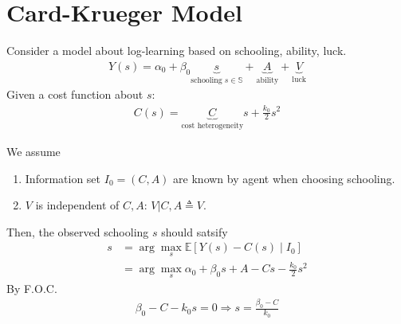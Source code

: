 \documentclass[11pt]{elegantbook}
\begin{document}
\section{Card-Krueger Model}
Consider a model about log-learning based on schooling, ability, luck.
\begin{equation}
    \begin{aligned}
        Y(s)=\alpha_0+\beta_0 \underbrace{s}_{\text{schooling }s\in \mathbb{S}} +\underbrace{A}_\text{ability} + \underbrace{V}_\text{luck}
    \end{aligned}
    \nonumber
\end{equation}
Given a cost function about $s$:
\begin{equation}
    \begin{aligned}
        C(s)=\underbrace{C}_\text{cost heterogeneity}s+\frac{k_0}{2}s^2
    \end{aligned}
    \nonumber
\end{equation}
\begin{assumption}
    We assume
    \begin{enumerate}
        \item Information set $I_0=(C,A)$ are known by agent when choosing schooling.
        \item $V$ is independent of $C,A$: $V|C,A\triangleq V$.
    \end{enumerate}
\end{assumption}
Then, the observed schooling $s$ should satsify
\begin{equation}
    \begin{aligned}
        s&=\arg\max_s \mathbb{E}[Y(s)-C(s)\mid I_0]\\
        &=\arg\max_s \alpha_0+\beta_0 s+A-Cs-\frac{k_0}{2}s^2
    \end{aligned}
    \nonumber
\end{equation}
By F.O.C.
\begin{equation}
    \begin{aligned}
        \beta_0-C-k_0 s=0 \Rightarrow s=\frac{\beta_0-C}{k_0}
    \end{aligned}
    \nonumber
\end{equation}
\end{document}
